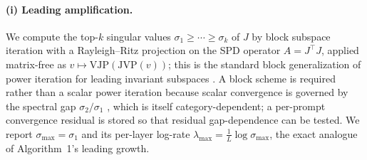 \documentclass{article}
\begin{document}
\paragraph{(i) Leading amplification.}
We compute the top-$k$ singular values $\sigma_1\ge\cdots\ge\sigma_k$ of $J$ by block subspace
iteration with a Rayleigh--Ritz projection on the SPD operator $A=J^\top J$, applied matrix-free as
$v\mapsto\mathrm{VJP}(\mathrm{JVP}(v))$; this is the standard block generalization of power
iteration for leading invariant subspaces \cite{golub2013matrix,halko2011finding}. A block scheme
is required rather than a scalar power iteration because scalar convergence is governed by the
spectral gap $\sigma_2/\sigma_1$ \cite{golub2013matrix}, which is itself category-dependent; a
per-prompt convergence residual is stored so that residual gap-dependence can be tested. We report
$\sigma_{\max}=\sigma_1$ and its per-layer log-rate $\lambda_{\max}=\tfrac1L\log\sigma_{\max}$, the
exact analogue of Algorithm~1's leading growth.
\end{document}
